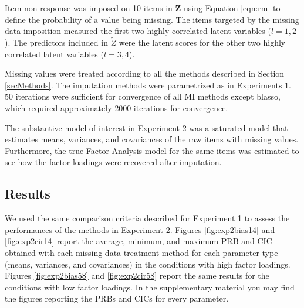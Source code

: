 
	Item non-response was imposed on 10 items in $\bm{Z}$ using Equation \ref{eqn:rm} to define the probability
	of a value being missing.
	The items targeted by the missing data imposition measured the first two highly correlated latent variables
	($l = 1, 2$).
	The predictors included in $\tilde{Z}$ were the latent scores for the other two highly correlated latent 
	variables ($l = 3, 4$).
	
	
	Missing values were treated according to all the methods described in Section \ref{secMethods}.
	The imputation methods were parametrized as in Experiments 1.
	50 iterations were sufficient for convergence of all MI methods except blasso, which required approximately 
	2000 iterations for convergence.

	
	The substantive model of interest in Experiment 2 was a saturated model that estimates means,
	variances, and covariances of the raw items with missing values.
	Furthermore, the true Factor Analysis model for the same items was estimated to see how the 
	factor loadings were recovered after imputation.

\subsection{Results}
	We used the same comparison criteria described for Experiment 1 to assess the performances of the methods 
	in Experiment 2.
	Figures \ref{fig:exp2bias14} and \ref{fig:exp2cir14} report the average, minimum, and maximum PRB and CIC obtained
	with each missing data treatment method for each parameter type (means, variances, and covariances) in the 
	conditions with high factor loadings.
	Figures \ref{fig:exp2bias58} and \ref{fig:exp2cir58} report the same results for the conditions with low 
	factor loadings.
	In the supplementary material you may find the figures reporting the PRBs and CICs for every parameter.


